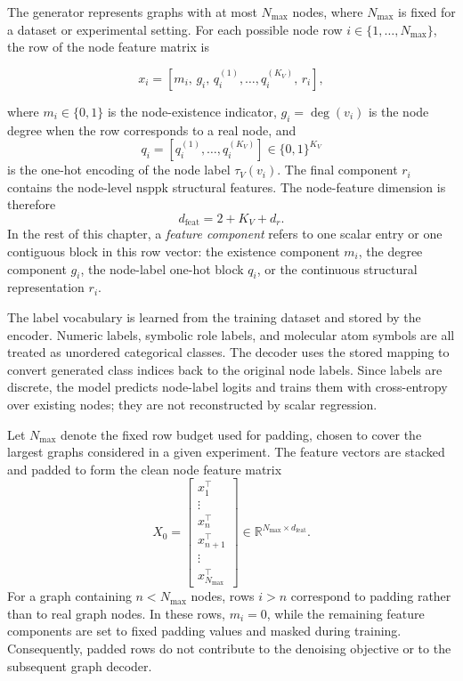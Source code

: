 The generator represents graphs with at most \(N_{\max}\) nodes, where
\(N_{\max}\) is fixed for a dataset or experimental setting. For each possible
node row \(i\in\{1,\ldots,N_{\max}\}\), the row of the node feature matrix is

\[
    x_i =
    \left[
        m_i,\,
        g_i,\,
        q_i^{(1)}, \ldots, q_i^{(K_V)},\,
        r_i
    \right],
\]

where \(m_i\in\{0,1\}\) is the node-existence indicator, \(g_i=\deg(v_i)\) is
the node degree when the row corresponds to a real node, and
\[
    q_i
    =
    \left[
        q_i^{(1)},\ldots,q_i^{(K_V)}
    \right]
    \in
    \{0,1\}^{K_V}
\]
is the one-hot encoding of the node label \(\tau_V(v_i)\). The final component
\(r_i\) contains the node-level \gls{nsppk} structural features. The
node-feature dimension is therefore
\[
    d_{\mathrm{feat}} = 2 + K_V + d_r.
\]
In the rest of this chapter, a \emph{feature component} refers to one scalar
entry or one contiguous block in this row vector: the existence component
\(m_i\), the degree component \(g_i\), the node-label one-hot block \(q_i\), or
the continuous structural representation \(r_i\).

The label vocabulary is learned from the training dataset and stored by the
encoder. Numeric labels, symbolic role labels, and molecular atom symbols are
all treated as unordered categorical classes. The decoder uses the stored
mapping to convert generated class indices back to the original node labels.
Since labels are discrete, the model predicts node-label logits and trains them
with cross-entropy over existing nodes; they are not reconstructed by scalar
regression.

Let \(N_{\max}\) denote the fixed row budget used for padding, chosen to cover
the largest graphs considered in a given experiment. The feature vectors are
stacked and padded to form the clean node feature matrix
\[
    X_0
    =
    \begin{bmatrix}
        x_1^\top\\
        \vdots\\
        x_n^\top\\
        x_{n+1}^\top\\
        \vdots\\
        x_{N_{\max}}^\top
    \end{bmatrix}
    \in
    \mathbb{R}^{N_{\max}\times d_{\mathrm{feat}}}.
\]
For a graph containing \(n<N_{\max}\) nodes, rows \(i>n\) correspond to padding
rather than to real graph nodes. In these rows, \(m_i=0\), while the remaining
feature components are set to fixed padding values and masked during training.
Consequently, padded rows do not contribute to the denoising objective or to
the subsequent graph decoder.

